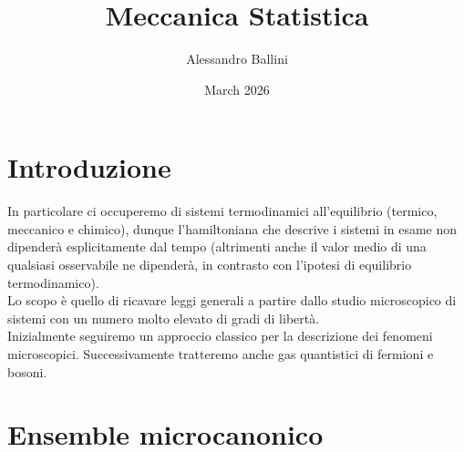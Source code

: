 \documentclass{article}
\title{Meccanica Statistica}
\author{Alessandro Ballini}
\date{March 2026}
\begin{document}
\maketitle
\tableofcontents
\newpage

\section*{Introduzione}
In particolare ci occuperemo di sistemi termodinamici all'equilibrio (termico, meccanico e chimico), dunque l'hamiltoniana che descrive i sistemi in esame non dipenderà esplicitamente dal tempo (altrimenti anche il valor medio di una qualsiasi osservabile ne dipenderà, in contrasto con l'ipotesi di equilibrio termodinamico). \\
Lo scopo è quello di ricavare leggi generali a partire dallo studio microscopico di sistemi con un numero molto elevato di gradi di libertà. \\
Inizialmente seguiremo un approccio classico per la descrizione dei fenomeni microscopici. Successivamente tratteremo anche gas quantistici di fermioni e bosoni.


\newpage
\section{Ensemble microcanonico}
\end{document}

